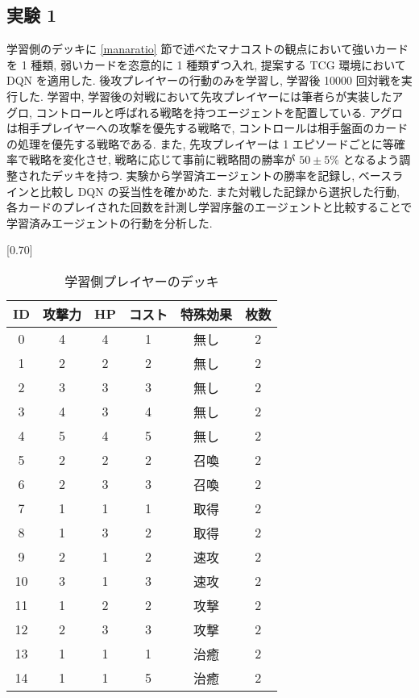 \documentclass[twocolumn]{jarticle}
\begin{document}
\subsection{実験 1}
学習側のデッキに \ref{manaratio} 節で述べたマナコストの観点において強いカードを 1 種類, 弱いカードを恣意的に 1 種類ずつ入れ, 提案する TCG 環境において DQN を適用した. 後攻プレイヤーの行動のみを学習し, 学習後 10000 回対戦を実行した. 学習中, 学習後の対戦において先攻プレイヤーには筆者らが実装したアグロ, コントロールと呼ばれる戦略を持つエージェントを配置している. アグロは相手プレイヤーへの攻撃を優先する戦略で, コントロールは相手盤面のカードの処理を優先する戦略である. また, 先攻プレイヤーは 1 エピソードごとに等確率で戦略を変化させ, 戦略に応じて事前に戦略間の勝率が $50 \pm 5\%$ となるよう調整されたデッキを持つ. 実験から学習済エージェントの勝率を記録し, ベースラインと比較し DQN の妥当性を確かめた. また対戦した記録から選択した行動, 各カードのプレイされた回数を計測し学習序盤のエージェントと比較することで学習済みエージェントの行動を分析した.
\begin{table}[t]
   \centering
   \caption{学習側プレイヤーのデッキ}
   \label{table:OPdeck}
   \vspace{-0.3cm}
   \scalebox{0.70}[0.70]{
     \begin{tabular}{|c|c|c|c|c|c|}
       \hline
       ID & 攻撃力 & HP & コスト & 特殊効果 & 枚数 \\ \hline
       0 & 4 & 4 & 1 & 無し & 2 \\ \hline
       1 & 2 & 2 & 2 & 無し & 2 \\ \hline
       2 & 3 & 3 & 3 & 無し & 2 \\ \hline
       3 & 4 & 3 & 4 & 無し & 2 \\ \hline
       4 & 5 & 4 & 5 & 無し & 2 \\ \hline
       5 & 2 & 2 & 2 & 召喚 & 2 \\ \hline
       6 & 2 & 3 & 3 & 召喚 & 2 \\ \hline
       7 & 1 & 1 & 1 & 取得 & 2 \\ \hline
       8 & 1 & 3 & 2 & 取得 & 2 \\ \hline
       9 & 2 & 1 & 2 & 速攻 & 2 \\ \hline
       10 & 3 & 1 & 3 & 速攻 & 2 \\ \hline
       11 & 1 & 2 & 2 & 攻撃 & 2 \\ \hline
       12 & 2 & 3 & 3 & 攻撃 & 2 \\ \hline
       13 & 1 & 1 & 1 & 治癒 & 2 \\ \hline
       14 & 1 & 1 & 5 & 治癒 & 2 \\ \hline
       \end{tabular}
   }
   
   \end{table}
\end{document}
